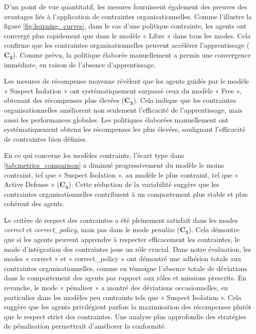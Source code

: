 D'un point de vue quantitatif, les mesures fournissent également des preuves des avantages liés à l'application de contraintes organisationnelles. Comme l'illustre la figure \autoref{fig:learning_curves}, dans le cas d'une politique contrainte, les agents ont convergé plus rapidement que dans le modèle « Libre » dans tous les modes. Cela confirme que les contraintes organisationnelles peuvent accélérer l'apprentissage ($\mathbf{C_2}$). Comme prévu, la politique élaborée manuellement a permis une convergence immédiate, en raison de l'absence d'apprentissage.

Les mesures de récompense moyenne révèlent que les agents guidés par le modèle « Suspect Isolation » ont systématiquement surpassé ceux du modèle « Free », obtenant des récompenses plus élevées ($\mathbf{C_3}$). Cela indique que les contraintes organisationnelles améliorent non seulement l'efficacité de l'apprentissage, mais aussi les performances globales. Les politiques élaborées manuellement ont systématiquement obtenu les récompenses les plus élevées, soulignant l'efficacité de contraintes bien définies.

En ce qui concerne les modèles contraints, l'écart type dans \autoref{tab:metrics_comparison} a diminué progressivement du modèle le moins contraint, tel que « Suspect Isolation », au modèle le plus contraint, tel que « Active Defense » ($\mathbf{C_4}$). Cette réduction de la variabilité suggère que les contraintes organisationnelles contribuent à un comportement plus stable et plus cohérent des agents.

Le critère de respect des contraintes a été pleinement satisfait dans les modes \textit{correct} et \textit{correct\_policy}, mais pas dans le mode \textit{penalize} ($\mathbf{C_5}$). Cela démontre que si les agents peuvent apprendre à respecter efficacement les contraintes, le mode d'intégration des contraintes joue un rôle crucial. Dans notre évaluation, les modes « correct » et « correct\_policy » ont démontré une adhésion totale aux contraintes organisationnelles, comme en témoigne l'absence totale de déviations dans le comportement des agents par rapport aux rôles et missions prescrits. En revanche, le mode « pénaliser » a montré des déviations occasionnelles, en particulier dans les modèles peu contraints tels que « Suspect Isolation ». Cela suggère que les agents privilégient parfois la maximisation des récompenses plutôt que le respect strict des contraintes. Une analyse plus approfondie des stratégies de pénalisation permettrait d'améliorer la conformité.

